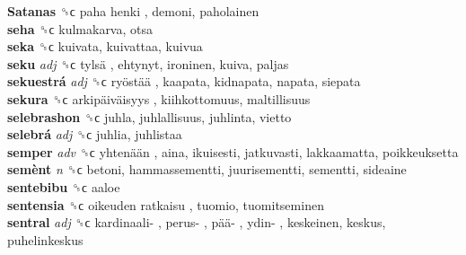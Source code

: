 \textbf{Satanas} ␝ϲ   paha henki , demoni, paholainen  \\
\textbf{seha} ␝ϲ  kulmakarva, otsa  \\
\textbf{seka} ␝ϲ  kuivata, kuivattaa, kuivua  \\
\textbf{seku} \emph{adj}  ␝ϲ   tylsä , ehtynyt, ironinen, kuiva, paljas  \\
\textbf{sekuestrá} \emph{adj}  ␝ϲ   ryöstää , kaapata, kidnapata, napata, siepata  \\
\textbf{sekura} ␝ϲ   arkipäiväisyys , kiihkottomuus, maltillisuus  \\
\textbf{selebrashon} ␝ϲ  juhla, juhlallisuus, juhlinta, vietto  \\
\textbf{selebrá} \emph{adj}  ␝ϲ  juhlia, juhlistaa  \\
\textbf{semper} \emph{adv}  ␝ϲ   yhtenään , aina, ikuisesti, jatkuvasti, lakkaamatta, poikkeuksetta  \\
\textbf{semènt} \emph{n}  ␝ϲ  betoni, hammassementti, juurisementti, sementti, sideaine  \\
\textbf{sentebibu} ␝ϲ  aaloe  \\
\textbf{sentensia} ␝ϲ   oikeuden ratkaisu , tuomio, tuomitseminen  \\
\textbf{sentral} \emph{adj}  ␝ϲ   kardinaali- ,  perus- ,  pää- ,  ydin- , keskeinen, keskus, puhelinkeskus  \\
